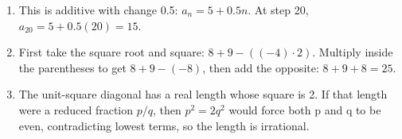 \documentclass[12pt,letterpaper]{article}
\begin{document}
\begin{enumerate}[label=R\arabic*.,leftmargin=2.5em,itemsep=10pt]
\item This is additive with change 0.5: $a_n=5+0.5n$. At step 20, $a_{20}=5+0.5(20)=15$.
\item First take the square root and square: $8+9-((-4)\cdot2)$. Multiply inside the parentheses to get $8+9-(-8)$, then add the opposite: $8+9+8=25$.
\item The unit-square diagonal has a real length whose square is 2. If that length were a reduced fraction $p/q$, then $p^2=2q^2$ would force both p and q to be even, contradicting lowest terms, so the length is irrational.
\end{enumerate}
\end{document}
